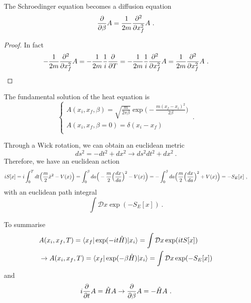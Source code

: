     The Schroedinger equation becomes a diffusion equation 
    \begin{equation*}
        \frac{\partial}{\partial\beta} A = \frac{1}{2m} \frac{\partial^2 }{\partial x_f^2} A ~.
    \end{equation*}
    \begin{proof}
        In fact
        \begin{equation*}
            - \frac{1}{2m} \frac{\partial^2 }{\partial x_f^2} A = - \frac{1}{2m} \frac{1}{i} \frac{\partial}{\partial T} = - \frac{1}{2m} \frac{1}{i} \frac{\partial^2 }{\partial x_f^2} A = \frac{1}{2m} \frac{\partial^2 }{\partial x_f^2} A ~.
        \end{equation*}
    \end{proof}

    The fundamental solution of the heat equation is 
    \begin{equation*}
        \begin{cases}
            A(x_i, x_f, \beta) = \sqrt{\frac{m}{2\pi\beta}} \exp \Big (- \frac{m (x_f - x_i)^2}{2\beta} \Big) \\
            A(x_i, x_f, \beta = 0) = \delta (x_i - x_f) \\
        \end{cases} ~.
    \end{equation*}

    Through a Wick rotation, we can obtain an euclidean metric 
    \begin{equation*}
        ds^2 = - dt^2 + dx^2 \rightarrow ds^2 dt^2 + dx^2 ~.
    \end{equation*}
    Therefore, we have an euclidean action 
    \begin{equation*}
    \begin{aligned}
        i S[x] = i \int_0^T dt \Big ( \frac{m}{2} \dot x^2 - V(x) \Big) = \int_{0}^{\beta} da \Big (- \frac{m}{2} \Big (\frac{dx}{da} \Big )^2 - V(x) \Big ) = - \int_{0}^{\beta} da \Big (\frac{m}{2} \Big (\frac{dx}{da} \Big )^2 + V(x) \Big ) = - S_E [x] ~,
    \end{aligned}
    \end{equation*}
    with an euclidean path integral 
    \begin{equation*}
        \int \mathcal D x \exp(- S_E [x]) ~.
    \end{equation*}

    To summarise 
    \begin{equation*}
    \begin{aligned}
        & A(x_i, x_f, T) = \langle x_f\vert \exp(- i t \hat H) \vert x_i\rangle = \int \mathcal D x \exp(i t S[x]) \\ & \rightarrow A(x_i, x_f, T) = \langle x_f\vert \exp(- \beta \hat H) \vert x_i\rangle = \int \mathcal D x \exp(- S_E [x]) 
    \end{aligned}
    \end{equation*}
    and 
    \begin{equation*}
        i \frac{\partial}{\partial t} A = \hat H A \rightarrow \frac{\partial}{\partial\beta} A = - \hat H A ~.
    \end{equation*}

